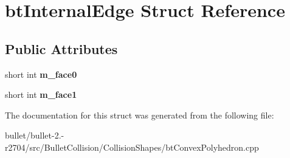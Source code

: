 \hypertarget{structbt_internal_edge}{\section{bt\+Internal\+Edge Struct Reference}
\label{structbt_internal_edge}
}
\subsection*{Public Attributes}
\begin{DoxyCompactItemize}
\item 
\hypertarget{structbt_internal_edge_a479539704a0bdb29f0889c503b8241d5}{short int {\bfseries m\+\_\+face0}}\label{structbt_internal_edge_a479539704a0bdb29f0889c503b8241d5}

\item 
\hypertarget{structbt_internal_edge_a0cd3f3af3d43c82518763932f8f54cc5}{short int {\bfseries m\+\_\+face1}}\label{structbt_internal_edge_a0cd3f3af3d43c82518763932f8f54cc5}

\end{DoxyCompactItemize}


The documentation for this struct was generated from the following file\+:\begin{DoxyCompactItemize}
\item 
bullet/bullet-\/2.-\/r2704/src/\+Bullet\+Collision/\+Collision\+Shapes/bt\+Convex\+Polyhedron.\+cpp\end{DoxyCompactItemize}
